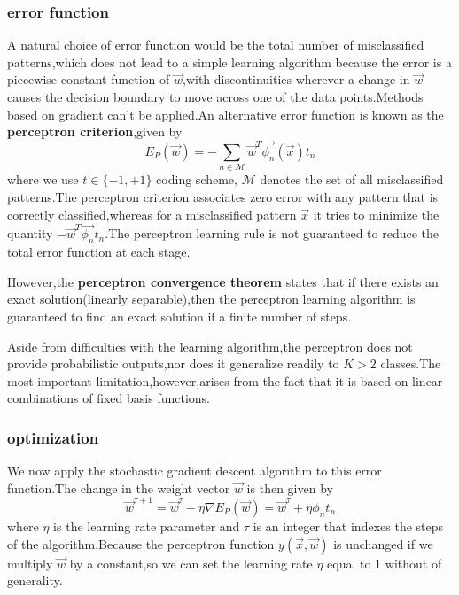 \subsubsection{error function}
A natural choice of error function would be the total number of misclassified patterns,which does not lead to a simple learning algorithm because the error is a piecewise constant function of $\vec{w}$,with discontinuities wherever a change in $\vec{w}$ causes the decision boundary to move across one of the data points.Methods based on gradient can't be applied.An alternative error function is known as the \textbf{perceptron criterion},given by
\begin{equation}
E_P(\vec{w}) = -\sum_{n\in \mathcal{M}}{\vec{w}^T\vec{\phi_n}(\vec{x})t_n}
\end{equation}
where we use $t\in \{-1,+1\}$ coding scheme, $\mathcal{M}$ denotes the set of all misclassified patterns.The perceptron criterion associates zero error with any pattern that is correctly classified,whereas for a misclassified pattern $\vec{x}$ it tries to minimize the quantity $-\vec{w}^T\vec{\phi_n}t_n$.The perceptron learning rule is not guaranteed to reduce the total error function at each stage.

However,the \textbf{perceptron convergence theorem} states that if there exists an exact solution(linearly separable),then the perceptron learning algorithm is guaranteed to find an exact solution if a finite number of steps.

Aside from difficulties with the learning algorithm,the perceptron does not provide probabilistic outputs,nor does it generalize readily to $K>2$ classes.The most important limitation,however,arises from the fact that it is based on linear combinations of fixed basis functions.

\subsubsection{optimization}
We now apply the stochastic gradient descent algorithm to this error function.The change in the weight vector $\vec{w}$ is then given by
\begin{equation}
\vec{w}^{\tau+1} = \vec{w}^{\tau} - \eta\nabla E_P(\vec{w}) = \vec{w}^{\tau} + \eta\phi_n t_n
\end{equation}
where $\eta$ is the learning rate parameter and $\tau$ is an integer that indexes the steps of the algorithm.Because the perceptron function $y(\vec{x},\vec{w})$ is unchanged if we multiply $\vec{w}$ by a constant,so we can set the learning rate $\eta$ equal to 1 without of generality.

